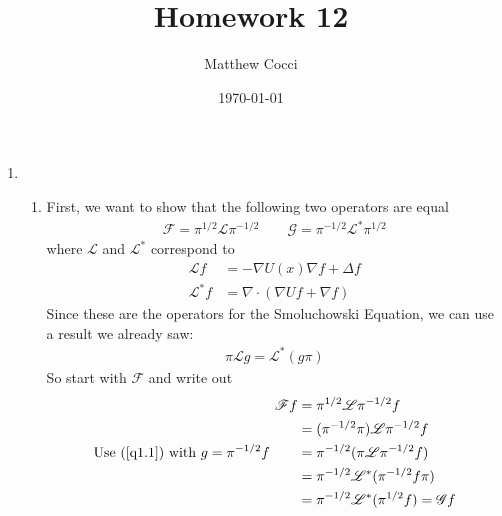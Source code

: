 \documentclass[12pt]{article}
\author{Matthew Cocci}
\title{Homework 12}
\date{\today}
\theoremstyle{plain}
\theoremstyle{definition}
\theoremstyle{remark}
\begin{document}
\maketitle



\begin{enumerate}
  \item %
    \begin{enumerate}
      \item %
        First, we want to show that the following two operators are
        equal
        \begin{align*}
          \mathscr{F} = \pi^{1/2} \mathscr{L} \pi^{-1/2}
          \qquad
          \mathscr{G} = \pi^{-1/2} \mathscr{L}^* \pi^{1/2}
        \end{align*}
        where $\mathscr{L}$ and $\mathscr{L}^*$ correspond to
        \begin{align*}
          \mathscr{L}f   &= -\nabla U(x) \nabla f + \Delta f\\
          \mathscr{L}^*f &= \nabla \cdot \left( \nabla Uf + \nabla f\right)
        \end{align*}
        Since these are the operators for the Smoluchowski Equation, we can
        use a result we already saw:
        \begin{align}
          \pi\mathscr{L}g = \mathscr{L}^*(g\pi)
          \label{q1.1}
        \end{align}
        So start with $\mathscr{F}$ and write out
        \begin{align*}
          \mathscr{F}f
          &= \pi^{1/2} \mathscr{L} \pi^{-1/2}f\\
          &= (\pi^{-1/2} \pi) \mathscr{L} \pi^{-1/2}f\\
          \text{Use (\ref{q1.1}) with $g=\pi^{-1/2}f$}\qquad
          &= \pi^{-1/2} (\pi \mathscr{L} \pi^{-1/2}f)\\
          &= \pi^{-1/2} \mathscr{L}^* (\pi^{-1/2}f\pi)\\
          &= \pi^{-1/2} \mathscr{L}^* (\pi^{1/2}f) = \mathscr{G}f
        \end{align*}


\end{enumerate}
\end{enumerate}
\end{document}
